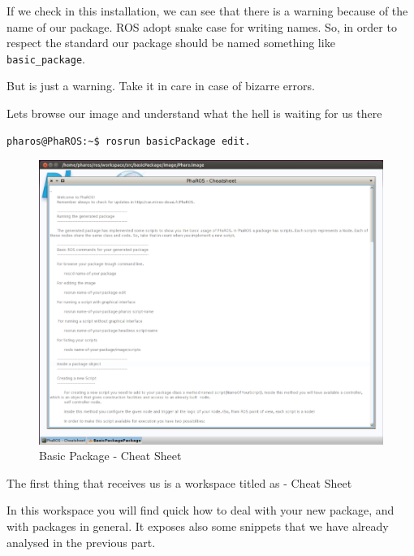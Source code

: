 \documentclass[a4paper,10pt,twoside]{book}
\begin{document}
				If we check in this installation, we can see that there is a warning because of the name of our package. ROS adopt snake case for writing names. So, in order to respect the standard our package should be named something like \verb|basic_package|. 
							
				But is just a warning. Take it in care in case of bizarre errors. 
				
				Lets browse our image and understand what the hell is waiting for us there
				
				\begin{lstlisting}[language=bash,title={ Default package editing }]
					pharos@PhaROS:~$ rosrun basicPackage edit.
				\end{lstlisting} 
				
				
				
				\begin{figure}[!htbp]
			  		\centering
				    		\includegraphics[width=1\textwidth]{BasicPackage1.png}
						
						\caption{Basic Package - Cheat Sheet}
					\centering
				\end{figure}
				
				
				The first thing that receives us is a workspace titled as \fwkName{} - Cheat Sheet
				
				In this workspace you will find quick how to deal with your new package, and with packages in general. It exposes also some snippets that we have already analysed in the previous part.
				
\end{document}
